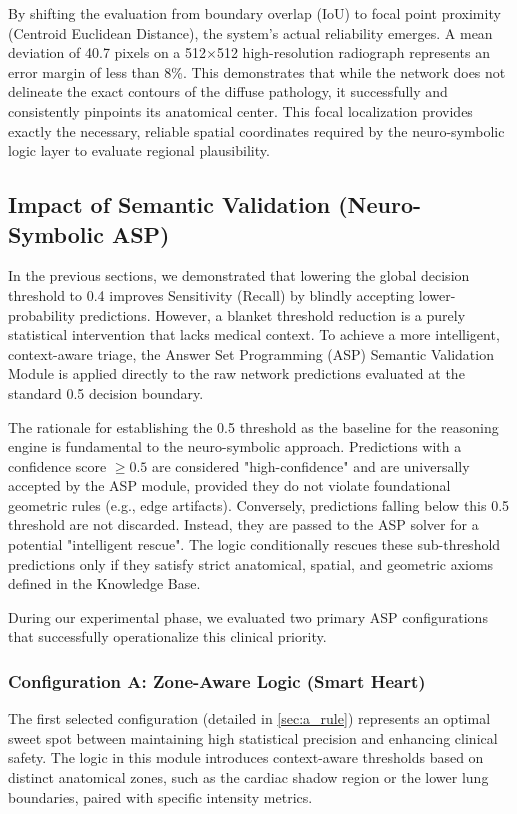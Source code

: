 \documentclass[a4paper,fleqn]{cas-dc}
\begin{document}
By shifting the evaluation from boundary overlap (IoU) to focal point proximity (Centroid Euclidean Distance), the system's actual reliability emerges. A mean deviation of 40.7 pixels on a 512$\times$512 high-resolution radiograph represents an error margin of less than 8\%. This demonstrates that while the network does not delineate the exact contours of the diffuse pathology, it successfully and consistently pinpoints its anatomical center. This focal localization provides exactly the necessary, reliable spatial coordinates required by the neuro-symbolic logic layer to evaluate regional plausibility.

\subsection{Impact of Semantic Validation (Neuro-Symbolic ASP)}
In the previous sections, we demonstrated that lowering the global decision threshold to 0.4 improves Sensitivity (Recall) by blindly accepting lower-probability predictions. However, a blanket threshold reduction is a purely statistical intervention that lacks medical context. To achieve a more intelligent, context-aware triage, the Answer Set Programming (ASP) Semantic Validation Module is applied directly to the raw network predictions evaluated at the standard 0.5 decision boundary.

The rationale for establishing the 0.5 threshold as the baseline for the reasoning engine is fundamental to the neuro-symbolic approach. Predictions with a confidence score $\ge 0.5$ are considered "high-confidence" and are universally accepted by the ASP module, provided they do not violate foundational geometric rules (e.g., edge artifacts). Conversely, predictions falling below this 0.5 threshold are not discarded. Instead, they are passed to the ASP solver for a potential "intelligent rescue". The logic conditionally rescues these sub-threshold predictions only if they satisfy strict anatomical, spatial, and geometric axioms defined in the Knowledge Base. 

During our experimental phase, we evaluated two primary ASP configurations that successfully operationalize this clinical priority.

\subsubsection{Configuration A: Zone-Aware Logic (Smart Heart)}
The first selected configuration (detailed in \ref{sec:a_rule}) represents an optimal sweet spot between maintaining high statistical precision and enhancing clinical safety. The logic in this module introduces context-aware thresholds based on distinct anatomical zones, such as the cardiac shadow region or the lower lung boundaries, paired with specific intensity metrics.
\end{document}
